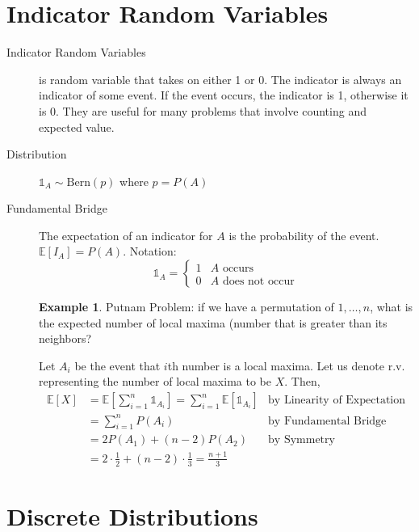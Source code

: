 \documentclass[11pt]{article}
\theoremstyle{definition}
\newtheorem{example}[theo]{\color{Maroon} Example}
\theoremstyle{remark}
\newcommand{\Bern}{\text{Bern}}
\newcommand{\E}[1]{\mathbb{E}\left[ #1 \right]}
\newcommand{\ind}[1]{\mathds{1}_{#1}}
\begin{document}
\section{Indicator Random Variables}
\begin{description}
\item[Indicator Random Variables] is random variable that takes on either 1 or 0. The indicator is always an indicator of some event. If the event occurs, the indicator is 1, otherwise it is 0. They are useful for many problems that involve counting and expected value. 
\item[Distribution] $\ind{A} \sim \Bern(p)$ where $p = P(A)$
\item[Fundamental Bridge] The expectation of an indicator for $A$ is the probability of the event. $\E{I_A} = P(A)$. Notation: $$\ind{A} =
 \begin{cases}
   1 & A \text{ occurs} \\
   0 & A \text{ does not occur}
  \end{cases}$$

\begin{example}
Putnam Problem: if we have a permutation of $1, \ldots, n$, what is the expected number of local maxima (number that is greater than its neighbors?

Let $A_i$ be the event that $i$th number is a local maxima. Let us denote r.v. representing the number of local maxima to be $X$. Then, \begin{align*} \E{X} & = \E{ \sum_{i=1}^n \ind{A_i} } = \sum_{i=1}^n \E{\ind{A_i} } & \text{by Linearity of Expectation} \\ & = \sum_{i=1}^n P(A_i) & \text{by Fundamental Bridge} \\ & = 2 P(A_1) + (n-2) P(A_2) & \text{by Symmetry} \\ & = 2 \cdot \frac{1}{2} + (n-2) \cdot \frac{1}{3} = \frac{n+1}{3} \end{align*}
\end{example}

\end{description}

\section{Discrete Distributions}
\end{document}
